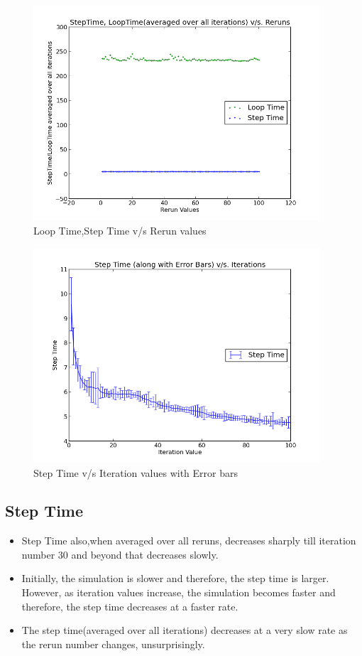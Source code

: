 \documentclass[11pt]{article}
\begin{document}
\begin{figure}[h!]
\caption{Loop Time,Step Time v/s Rerun values}
\centering
\includegraphics[height=8cm]{images/g19_proj_plot03}
\end{figure}
\begin{figure}[h!]
\caption{Step Time v/s Iteration values with Error bars}
\centering
\includegraphics[height=8cm]{images/g19_proj_plot05}
\end{figure}
\subsection{Step Time}
	\begin{itemize}
		\item Step Time also,when averaged over all reruns, decreases sharply till iteration number 30 and beyond that decreases slowly.
		\item Initially, the simulation is slower and therefore, the step time is larger. However, as iteration values increase, the simulation becomes faster and therefore, the step time decreases at a faster rate.
		\item The step time(averaged over all iterations) decreases at a very slow rate as the rerun number changes, unsurprisingly.
	\end{itemize}
\end{document}
